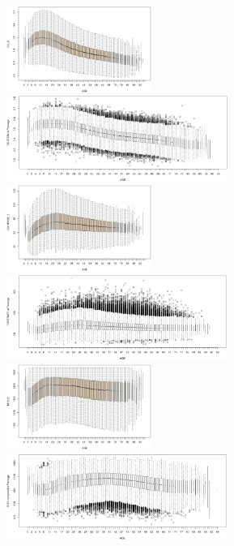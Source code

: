 \documentclass{cta-author}%
\begin{document}
\begin{figure}[!t]

\includegraphics[width=0.5\linewidth,height=1.1in]{eps/21DIL_E=f(AGE)-boxplot(Cam=B).eps}\quad
\includegraphics[width=0.5\linewidth,height=1.1in]{eps/DIL-PA.eps} 
\includegraphics[width=0.5\linewidth,height=1.1in]{eps/21CONTRAST_E=f(AGE)-boxplot(Cam=B).eps}\quad
\includegraphics[width=0.5\linewidth,height=1.1in]{eps/CONTRAST-PA.eps}
\includegraphics[width=0.5\linewidth,height=1.1in]{eps/21BITS_E=f(AGE)-boxplot(Cam=B).eps}\quad
\includegraphics[width=0.5\linewidth,height=1.1in]{eps/BITS-COMPARED.eps}\\ 


\end{figure}
\end{document}
